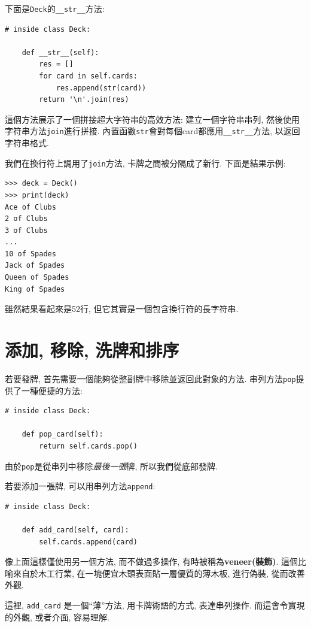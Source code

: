\documentclass[10pt]{book}
\begin{document}
下面是{\tt Deck}的\verb"__str__"方法:

\begin{verbatim}
# inside class Deck:

    def __str__(self):
        res = []
        for card in self.cards:
            res.append(str(card))
        return '\n'.join(res)
\end{verbatim}
%
這個方法展示了一個拼接超大字符串的高效方法: 建立一個字符串串列, 然後使用字符串方法{\tt join}進行拼接. 
內置函數{\tt str}會對每個card都應用\verb"__str__"方法, 以返回字符串格式.
 
  

我們在換行符上調用了{\tt join}方法, 卡牌之間被分隔成了新行. 
下面是結果示例:

\begin{verbatim}
>>> deck = Deck()
>>> print(deck)
Ace of Clubs
2 of Clubs
3 of Clubs
...
10 of Spades
Jack of Spades
Queen of Spades
King of Spades
\end{verbatim}
%
雖然結果看起來是52行, 但它其實是一個包含換行符的長字符串. 


\section{添加, 移除, 洗牌和排序}

若要發牌, 首先需要一個能夠從整副牌中移除並返回此對象的方法. 
串列方法{\tt pop}提供了一種便捷的方法:

\begin{verbatim}
# inside class Deck:

    def pop_card(self):
        return self.cards.pop()
\end{verbatim}
%
由於{\tt pop}是從串列中移除{\em 最後一張}牌, 所以我們從底部發牌. 

若要添加一張牌, 可以用串列方法{\tt append}:

\begin{verbatim}
# inside class Deck:

    def add_card(self, card):
        self.cards.append(card)
\end{verbatim}
%
像上面這樣僅使用另一個方法, 而不做過多操作, 有時被稱為{\bf veneer(裝飾)}. 
這個比喻來自於木工行業, 在一塊便宜木頭表面貼一層優質的薄木板, 進行偽裝, 
從而改善外觀. 

這裡, \verb"add_card" 是一個``薄''方法, 用卡牌術語的方式, 表達串列操作. 
而這會令實現的外觀, 或者介面, 容易理解. 
\end{document}
